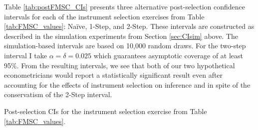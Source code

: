 Table \ref{tab:postFMSC_CIs} presents three alternative post-selection confidence intervals for each of the instrument selection exercises from Table \ref{tab:FMSC_values}: Na\"{i}ve, 1-Step, and 2-Step.
These intervals are constructed as described in the simulation experiments from Section \ref{sec:CIsim} above. 
The simulation-based intervals are based on 10,000 random draws.
For the two-step interval I take $\alpha = \delta = 0.025$ which guarantees asymptotic coverage of at least 95\%.
From the resulting intervals, we see that both of our two hypothetical econometricians would report a statistically significant result even after accounting for the effects of instrument selection on inference and in spite of the conservatism of the 2-Step interval.

\begin{table}[htbp]
  \small
	\centering
	
	\caption{Post-selection CIs for the instrument selection exercise from Table \ref{tab:FMSC_values}.}
	\label{tab:postFMSC_CIs}
\end{table}

